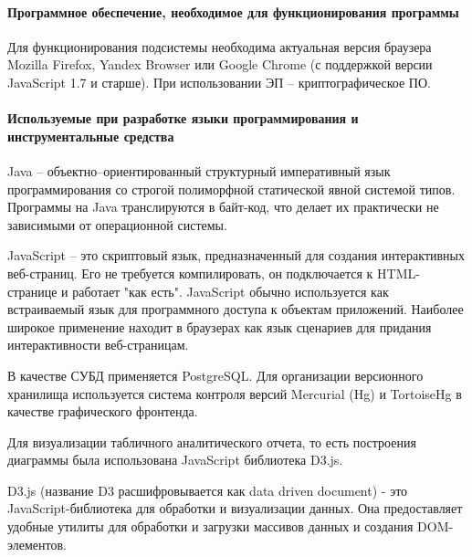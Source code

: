\documentclass[a4paper]{extarticle}
\begin{document}
\paragraph{Программное обеспечение, необходимое для функционирования программы}
Для функционирования подсистемы необходима актуальная версия браузера Mozilla Firefox, Yandex Browser или Google Chrome (с поддержкой версии JavaScript 1.7 и старше). При использовании ЭП – криптографическое ПО.

\paragraph{Используемые при разработке языки программирования и инструментальные средства}
Java – объектно–ориентированный структурный императивный язык программирования со строгой полиморфной статической явной системой типов. Программы на Java транслируются в байт-код, что делает их практически не зависимыми от операционной системы.\par
JavaScript – это скриптовый язык, предназначенный для создания интерактивных веб-страниц. Его не требуется компилировать, он подключается к HTML-странице и работает "как есть". JavaScript обычно используется как встраиваемый язык для программного доступа к объектам приложений. Наиболее широкое применение находит в браузерах как язык сценариев для придания интерактивности веб-страницам.\par
В качестве СУБД применяется PostgreSQL. Для организации версионного хранилища используется система контроля версий Mercurial (Hg) и TortoiseHg в качестве графического фронтенда.\par
Для визуализации табличного аналитического отчета, то есть построения диаграммы была использована JavaScript библиотека D3.js.\par
D3.js (название D3 расшифровывается как data driven document) - это JavaScript-библиотека для обработки и визуализации данных. Она предоставляет удобные утилиты для обработки и загрузки массивов данных и создания DOM-элементов.
\end{document}
